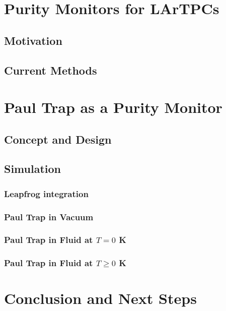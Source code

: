 \section{Purity Monitors for LArTPCs}
\subsection{Motivation}
\subsection{Current Methods}
\section{Paul Trap as a Purity Monitor}
\subsection{Concept and Design}
\subsection{Simulation}
\subsubsection{Leapfrog integration}
\subsubsection{Paul Trap in Vacuum}
\subsubsection{Paul Trap in Fluid at $T = 0$ K}
\subsubsection{Paul Trap in Fluid at $T \geqslant 0$ K}
\section{Conclusion and Next Steps}

